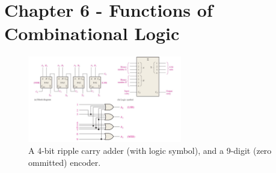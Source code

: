 \documentclass[10pt]{article}
\begin{document}
\section{Chapter 6 - Functions of Combinational Logic}
\label{sec:comb2}

\begin{figure}[ht]
\centering
\includegraphics[width=0.6\textwidth]{figures/adderEncoder.pdf}
\caption{\label{fig:encadd} A 4-bit ripple carry adder (with logic symbol), and a 9-digit (zero ommitted) encoder.}
\end{figure}
\end{document}

